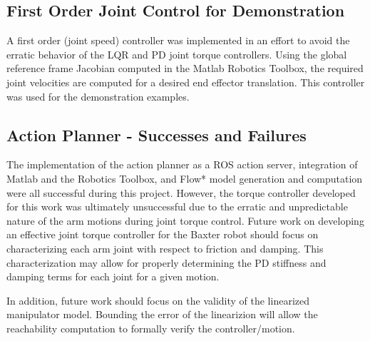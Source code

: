 \subsection{First Order Joint Control for Demonstration}
A first order (joint speed) controller was implemented in an effort to avoid the erratic behavior of the LQR and PD joint torque controllers.
Using the global reference frame Jacobian computed in the Matlab Robotics Toolbox, the required joint velocities are computed for a desired end effector translation.
This controller was used for the demonstration examples.

\subsection{Action Planner - Successes and Failures}
The implementation of the action planner as a ROS action server, integration of Matlab and the Robotics Toolbox, and Flow* model generation and computation were all successful during this project.
However, the torque controller developed for this work was ultimately unsuccessful due to the erratic and unpredictable nature of the arm motions during joint torque control.
Future work on developing an effective joint torque controller for the Baxter robot should focus on characterizing each arm joint with respect to friction and damping.
This characterization may allow for properly determining the PD stiffness and damping terms for each joint for a given motion.

In addition, future work should focus on the validity of the linearized manipulator model.
Bounding the error of the linearizion will allow the reachability computation to formally verify the controller/motion.

